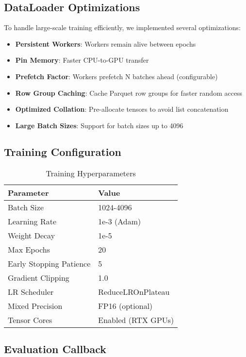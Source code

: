 \documentclass[12pt,a4paper]{article}
\begin{document}
\subsection{DataLoader Optimizations}

To handle large-scale training efficiently, we implemented several optimizations:

\begin{itemize}
    \item \textbf{Persistent Workers}: Workers remain alive between epochs
    \item \textbf{Pin Memory}: Faster CPU-to-GPU transfer
    \item \textbf{Prefetch Factor}: Workers prefetch N batches ahead (configurable)
    \item \textbf{Row Group Caching}: Cache Parquet row groups for faster random access
    \item \textbf{Optimized Collation}: Pre-allocate tensors to avoid list concatenation
    \item \textbf{Large Batch Sizes}: Support for batch sizes up to 4096
\end{itemize}

\subsection{Training Configuration}

\begin{table}[H]
\centering
\caption{Training Hyperparameters}
\begin{tabular}{@{}ll@{}}
\toprule
\textbf{Parameter} & \textbf{Value} \\
\midrule
Batch Size & 1024-4096 \\
Learning Rate & 1e-3 (Adam) \\
Weight Decay & 1e-5 \\
Max Epochs & 20 \\
Early Stopping Patience & 5 \\
Gradient Clipping & 1.0 \\
LR Scheduler & ReduceLROnPlateau \\
Mixed Precision & FP16 (optional) \\
Tensor Cores & Enabled (RTX GPUs) \\
\bottomrule
\end{tabular}
\end{table}

\subsection{Evaluation Callback}
\end{document}
